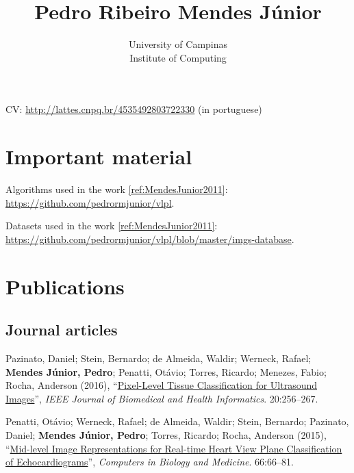 \documentclass{article}
\title{Pedro Ribeiro Mendes J{\'u}nior}
\author{University of Campinas\\Institute of Computing}
\newcommand{\myurl}[1]{\href{#1}{#1}}
\newcommand{\ifnotempty}[2]{\ifthenelse{\equal{#1}{}}{}{#2}}
\newcommand{\journal}[8]{\label{#1} #2, ``\href{#3}{#4}'', \emph{#5}. #6\ifnotempty{#7}{(#7)}:#8.}
\begin{document}
\nocite{Penatti2015}
\nocite{Pazinato2015}
\nocite{MendesJunior2011}

\maketitle

CV: \myurl{http://lattes.cnpq.br/4535492803722330} (in portuguese)


\section*{Important material}
\label{sec:important-material}

Algorithms used in the work \ref{ref:MendesJunior2011}: \myurl{https://github.com/pedrormjunior/vlpl}.

Datasets used in the work \ref{ref:MendesJunior2011}: \myurl{https://github.com/pedrormjunior/vlpl/blob/master/imgs-database}.

\section*{Publications}

\subsection*{Journal articles}

\begin{enumerate}[label={[\arabic*]}]
\item\journal{ref:Pazinato2016}
  {Pazinato, Daniel; Stein, Bernardo; de Almeida, Waldir; Werneck, Rafael; \textbf{Mendes Júnior, Pedro}; Penatti, Otávio; Torres, Ricardo; Menezes, Fabio; Rocha, Anderson (2016)}
  {http://dx.doi.org/10.1109/JBHI.2014.2386796}
  {Pixel-Level Tissue Classification for Ultrasound Images}
  {IEEE Journal of Biomedical and Health Informatics}
  {20}
  {1}
  {256--267}
\item\journal{ref:Penatti2015}
  {Penatti, Otávio; Werneck, Rafael; de Almeida, Waldir; Stein, Bernardo; Pazinato, Daniel; \textbf{Mendes Júnior, Pedro}; Torres, Ricardo; Rocha, Anderson (2015)}
  {http://dx.doi.org/10.1016/j.compbiomed.2015.08.004}
  {Mid-level Image Representations for Real-time Heart View Plane Classification of Echocardiograms}
  {Computers in Biology and Medicine}
  {66}
  {}
  {66--81}
\end{enumerate}
\end{document}
